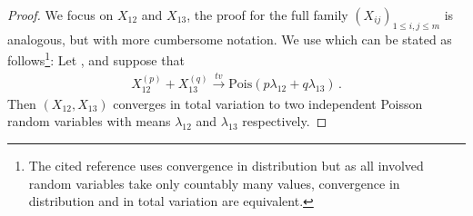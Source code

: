 \documentclass[12pt,a4paper]{article}
\numberwithin{equation}{section}
\begin{document}
\begin{proof}
    We focus on $X_{12}$ and $X_{13}$, the proof for the full family $(X_{ij})_{1\le i,j\le m}$ is analogous, but with more cumbersome notation. We use \cite[Corollary 2.2]{AHH} which can be stated as follows\footnote{The cited reference uses convergence in distribution but as all involved random variables take only countably many values, convergence in distribution and in total variation are equivalent.}: 
    Let ,  and suppose that 
    \begin{align} \label{whatistoshow}
         X_{12}^{(p)}+X_{13}^{(q)} \overset{tv}{\longrightarrow} \text{Pois}(p\lambda_{12} + q \lambda_{13})\,.
    \end{align}
   Then $(X_{12}, X_{13})$ converges in total variation to two independent Poisson random variables with means $\lambda_{12}$ and $\lambda_{13}$ respectively. 
   \smallskip
   

\end{proof}
\end{document}
